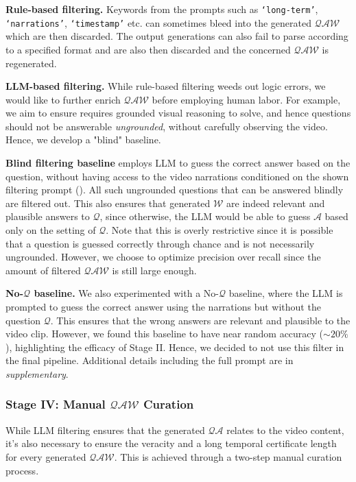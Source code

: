 \noindent \textbf{Rule-based filtering.} Keywords from the prompts such as \texttt{`long-term'}, \texttt{`narrations'}, \texttt{`timestamp'} etc. can sometimes bleed into the generated $\mathcal{QAW}$ which are then discarded. The output generations can also fail to parse according to a specified format and are also then discarded and the concerned $\mathcal{QAW}$ is regenerated. 

\noindent \textbf{LLM-based filtering.}  While rule-based filtering weeds out logic errors, we would like to further enrich $\mathcal{QAW}$ before employing human labor. For example, we aim to ensure\name{}{} requires grounded visual reasoning to solve, and hence questions should not be answerable \textit{ungrounded}, without carefully observing the video. Hence, we develop a "blind" baseline.

\noindent \textbf{Blind filtering baseline} employs LLM to guess the correct answer based on the question, without having access to the video narrations conditioned on the shown filtering prompt (). All such ungrounded questions that can be answered blindly are filtered out. This also ensures that generated $\mathcal{W}$ are indeed relevant and plausible answers to $\mathcal{Q}$, since otherwise, the LLM would be able to guess $\mathcal{A}$ based only on the setting of $\mathcal{Q}$. Note that this is overly restrictive since it is possible that a question is guessed correctly through chance and is not necessarily ungrounded. However, we choose to optimize precision over recall since the amount of filtered $\mathcal{QAW}$ is still large enough. 

\noindent \textbf{No-$\mathcal{Q}$ baseline.} We also experimented with a No-$\mathcal{Q}$ baseline, where the LLM is prompted to guess the correct answer using the narrations but without the question $\mathcal{Q}$. This ensures that the wrong answers are relevant and plausible to the video clip. However, we found this baseline to have near random accuracy ($\sim20\%$), highlighting the efficacy of Stage II. Hence, we decided to not use this filter in the final pipeline.  Additional details including the full prompt are in \textit{supplementary}. 

\subsubsection{Stage IV: Manual $\mathcal{QAW}$ Curation}
\label{sec:stage4}
While LLM filtering ensures that the generated $\mathcal{QA}$ relates to the video content, it's also necessary to ensure the veracity and a long temporal certificate length for every generated $\mathcal{QAW}$. This is achieved through a two-step manual curation process. 

